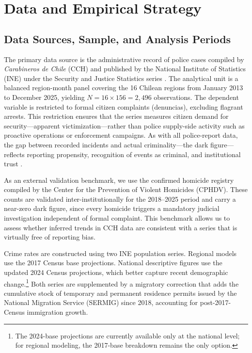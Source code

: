 \documentclass[pdflatex,sn-basic]{sn-jnl}
\begin{document}
\section{Data and Empirical Strategy}
\label{sec:datos}

\subsection{Data Sources, Sample, and Analysis Periods}

The primary data source is the administrative record of police cases compiled by \textit{Carabineros de Chile} (CCH) and published by the National Institute of Statistics (INE) under the Security and Justice Statistics series \citep{INE2026}. The analytical unit is a balanced region-month panel covering the 16 Chilean regions from January 2013 to December 2025, yielding $N = 16 \times 156 = 2{,}496$ observations. The dependent variable is restricted to formal citizen complaints (denuncias), excluding flagrant arrests. This restriction ensures that the series measures citizen demand for security---apparent victimization---rather than police supply-side activity such as proactive operations or enforcement campaigns. As with all police-report data, the gap between recorded incidents and actual criminality---the dark figure---reflects reporting propensity, recognition of events as criminal, and institutional trust \citep{gamarra2024a}.

As an external validation benchmark, we use the confirmed homicide registry compiled by the Center for the Prevention of Violent Homicides (CPHDV). These counts are validated inter-institutionally for the 2018--2025 period and carry a near-zero dark figure, since every homicide triggers a mandatory judicial investigation independent of formal complaint. This benchmark allows us to assess whether inferred trends in CCH data are consistent with a series that is virtually free of reporting bias.

Crime rates are constructed using two INE population series. Regional models use the 2017 Census base projections. National descriptive figures use the updated 2024 Census projections, which better capture recent demographic change.\footnote{The 2024-base projections are currently available only at the national level; for regional modeling, the 2017-base breakdown remains the only option.} Both series are supplemented by a migratory correction that adds the cumulative stock of temporary and permanent residence permits issued by the National Migration Service (SERMIG) since 2018, accounting for post-2017-Census immigration growth.
\end{document}
